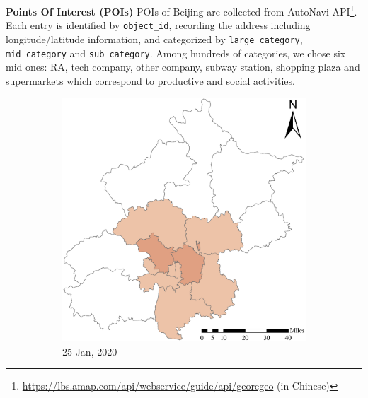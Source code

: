 \documentclass[preprints,ijgi,submit,moreauthors]{Definitions/mdpi}
\begin{document}
\textbf{Points Of Interest (POIs)} POIs of Beijing are collected from AutoNavi API\footnote{\url{https://lbs.amap.com/api/webservice/guide/api/georegeo} (in Chinese)}.
Each entry is identified by \texttt{object\_id}, recording the address including longitude/latitude information, and categorized by \texttt{large\_category}, \texttt{mid\_category} and \texttt{sub\_category}.
Among hundreds of categories, we chose six mid ones: RA, tech company, other company, subway station, shopping plaza and supermarkets which correspond to productive and social activities.

\begin{figure}[H]
    \centering
    \begin{subfigure}{.23\textwidth}
        \includegraphics[width=\textwidth]{Figures/ConfirmedDistrictD2020_01_25.eps}
        \caption{25 Jan, 2020}
    \end{subfigure}
    \begin{subfigure}{.23\textwidth}

\end{subfigure}
\end{figure}
\end{document}
